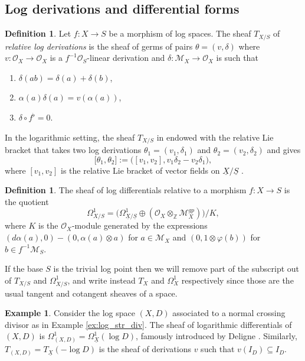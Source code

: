 \documentclass[reqno]{amsart}
\newcommand\Z{\mathbb{Z}}
\newcommand{\OO}{\mathcal{O}}
\newcommand{\M}{\mathcal{M}}
\theoremstyle{definition}
\newtheorem{definition}[theorem]{Definition}
\newtheorem{example}[theorem]{Example}
\theoremstyle{named}
\begin{document}
\subsection{Log derivations and differential forms}
\begin{definition} \label{def:logderivation}
Let $f:X\to S$ be a morphism of  log spaces. The sheaf $T_{X/S}$ of \textit{relative log derivations} is the sheaf of germs of pairs $\theta = (v,\delta)$ where $v: \OO_{X}\rightarrow \OO_{X}$ is a $f^{-1}\OO_S$-linear derivation and $\delta:\M_X\to \OO_X$ is such that
\begin{enumerate}
    \item $\delta(ab)=\delta(a)+\delta(b)$,
    \item $\alpha(a)\delta(a)= v(\alpha(a))$, 
    \item $\delta\circ f^{\flat}=0$.
\end{enumerate}
\end{definition}
In the logarithmic setting, the sheaf $T_{X/S}$ in endowed with the relative Lie bracket that takes two log derivations $\theta_1 = (v_1,\delta_1)$ and $\theta_2 = (v_2,\delta_2)$ and gives
    $$ \big[\theta_1,\theta_2\big]:=\big([v_1,v_2], v_1\delta_2-v_2\delta_1\big),$$
where $[v_1,v_2]$ is the relative Lie bracket of vector fields on $\underline{X}/\underline{S}$  \cite[Prop. 1.1.2]{ogus2018lectures}. 



\begin{definition}
The sheaf of log differentials relative to a morphism $f:X\rightarrow S$ is the quotient 
$$\Omega^1_{X/S}=\big(\Omega^1_{\underline{X}/\underline{S}} \oplus (\OO_X\otimes_\Z \M_X^{gp})\big)/K, $$
where $K$ is the $\OO_X$-module generated by the expressions $(d\alpha(a),0)-(0,\alpha(a)\otimes a)$ for $a\in \M_X$ and $(0,1\otimes \varphi(b))$ for $b\in f^{-1}\mathcal{M}_S$.    
\end{definition}

If the base $S$ is the trivial log point then we will remove part of the subscript out of $T_{X/S}$ and $\Omega^1_{X/S}$, and write instead $T_X$ and $\Omega^1_X$ respectively since those are the usual tangent and cotangent sheaves of a space.

\begin{example}
Consider the log space $(X,D)$ associated to a normal crossing divisor as in Example \ref{ex:log_str_div}. The sheaf of logarithmic differentials of $(X,D)$ is $\Omega^1_{(X,D)} = \Omega^1_{\underline{X}}(\log D)$, famously introduced by Deligne \cite{deligne1970equations}. Similarly, $T_{(X,D)} = T_{\underline{X}}(-\log D)$ is the sheaf of derivations $v$ such that $v(I_{D})\subseteq I_D$.
\end{example}
\end{document}
